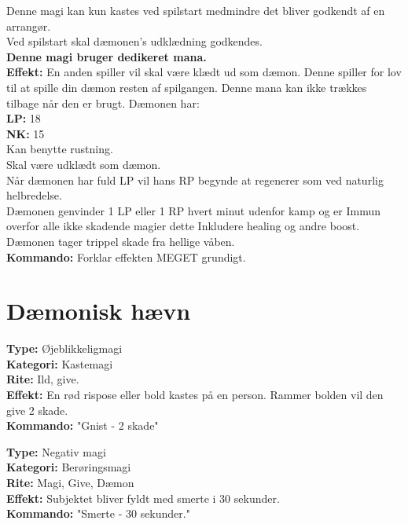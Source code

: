 \begin{sjæl*}
Denne magi kan kun kastes ved spilstart medmindre det bliver godkendt af en arrangør.\\
Ved spilstart skal dæmonen's udklædning godkendes.\\
\textbf{Denne magi bruger dedikeret mana.}\\
\textbf{Effekt:} En anden spiller vil skal være klædt ud som dæmon. Denne spiller for lov til at spille din dæmon resten af spilgangen. Denne mana kan ikke trækkes tilbage når den er brugt.
Dæmonen har:\\
\textbf{LP:} 18\\
\textbf{NK:} 15\\
Kan benytte rustning.\\
Skal være udklædt som dæmon.\\
Når dæmonen har fuld LP vil hans RP begynde at regenerer som ved naturlig helbredelse.\\ Dæmonen genvinder 1 LP eller 1 RP hvert minut udenfor kamp og er Immun overfor alle ikke skadende magier dette Inkludere healing og andre boost.\\
Dæmonen tager trippel skade fra hellige våben.\\
\textbf{Kommando:} Forklar effekten MEGET grundigt.
\end{sjæl*}

\section{Dæmonisk hævn}

\begin{dHævn*}[Gnist]
\textbf{Type:} Øjeblikkeligmagi\\
\textbf{Kategori:} Kastemagi\\
\textbf{Rite:} Ild, give.\\
\textbf{Effekt:} En rød rispose eller bold kastes på en person. Rammer bolden vil den give 2 skade.\\
\textbf{Kommando:} "Gnist - 2 skade"
\end{dHævn*}

\begin{dHævn*}[Smerte]
\textbf{Type:} Negativ magi\\
\textbf{Kategori:} Berøringsmagi\\
\textbf{Rite:} Magi, Give, Dæmon\\
\textbf{Effekt:} Subjektet bliver fyldt med smerte i 30 sekunder.\\
\textbf{Kommando:} "Smerte - 30 sekunder."
\end{dHævn*}

